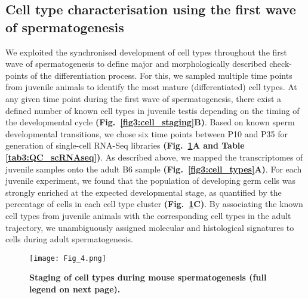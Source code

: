 \subsection{Cell type characterisation using the first wave of spermatogenesis}
 
We exploited the synchronised development of cell types throughout the first wave of spermatogenesis to define major and morphologically described check-points of the differentiation process. For this, we sampled multiple time points from juvenile animals to identify the most mature (differentiated) cell types. At any given time point during the first wave of spermatogenesis, there exist a defined number of known cell types in juvenile testis depending on the timing of the developmental cycle \textbf{(Fig.~\ref{fig3:cell_staging}B)}. Based on known sperm developmental transitions, we chose six time points between P10 and P35 for generation of single-cell RNA-Seq libraries \textbf{(Fig.~\ref{fig3:1st_wave}A and Table \ref{tab3:QC_scRNAseq})}. As described above, we mapped the transcriptomes of juvenile samples onto the adult B6 sample \textbf{(Fig.~\ref{fig3:cell_types}A)}. For each juvenile experiment, we found that the population of developing germ cells was strongly enriched at the expected developmental stage, as quantified by the percentage of cells in each cell type cluster \textbf{(Fig.~\ref{fig3:1st_wave}C)}. By associating the known cell types from juvenile animals with the corresponding cell types in the adult trajectory, we unambiguously assigned molecular and histological signatures to cells during adult spermatogenesis.

\newpage

\begin{figure}[!h]
\centering
\texttt{[image: Fig\_4.png]}
\caption[Staging of cell types during mouse spermatogenesis]{\textbf{Staging of cell types during mouse spermatogenesis (full legend on next page).}}
\label{fig3:1st_wave}
\end{figure}

\newpage

